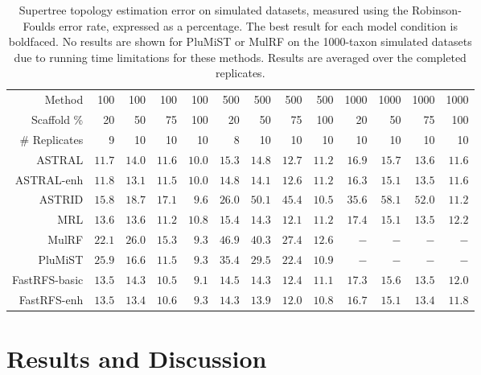 \begin{table}
\centering
\small
\begin{tabular}{|r|rrrrrrrrrrrr|}
\hline
Method&100 & 100 & 100 & 100 & 500 & 500 & 500 & 500 & 1000 & 1000 & 1000 &
1000\\
Scaffold \% &20 & 50 & 75 & 100 & 20 & 50 & 75 & 100 & 20 & 50 & 75 & 100\\
\# Replicates & 9 & 10 & 10 & 10 & 8 & 10 & 10 & 10 & 10 & 10 & 10 & 10 \\
\hline
\hline
ASTRAL& $\mathbf{11.7}$&$14.0$& $11.6$& $10.0$& $15.3$& $14.8$& $12.7$& $11.2$& $16.9$& $15.7$& $13.6$& $11.6$\\
ASTRAL-enh&$11.8$& $\mathbf{13.1}$&$11.5$& $10.0$& $14.8$&$14.1$& $12.6$& $11.2$& $\mathbf{16.3}$&$\mathbf{15.1}$&$13.5$&$11.6$\\
ASTRID& $15.8$& $18.7$& $17.1$&$9.6$&$26.0$& $50.1$& $45.4$&$\mathbf{10.5}$&$35.6$& $58.1$& $52.0$& $\mathbf{11.2}$\\
MRL&$13.6$& $13.6$& $11.2$& $10.8$& $15.4$& $14.3$& $12.1$& $11.2$& $17.4$&$\mathbf{15.1}$&$13.5$& $12.2$\\
MulRF&$22.1$& $26.0$& $15.3$& $9.3$&$46.9$& $40.3$& $27.4$& $12.6$& $-$&$-$&$-$&$-$\\
PluMiST&$25.9$& $16.6$& $11.5$& $9.3$&$35.4$& $29.5$& $22.4$& $10.9$&$-$&$-$&$-$&$-$\\
\hline
FastRFS-basic&$13.5$& $14.3$& $\mathbf{10.5}$&$\mathbf{9.1}$& $14.5$&$14.3$& $12.4$& $11.1$& $17.3$& $15.6$& $13.5$& $12.0$\\
FastRFS-enh&$13.5$& $13.4$& $10.6$& $9.3$&$\mathbf{14.3}$&$\mathbf{13.9}$&$\mathbf{12.0}$&$10.8$& $16.7$&$\mathbf{15.1}$&$\mathbf{13.4}$&$11.8$\\
\hline
\end{tabular}
  \caption[Supertree estimation error on simulated datasets for FastRFS and other methods]{Supertree topology estimation error on simulated datasets,
 measured using the Robinson-Foulds error rate, expressed
as a percentage.
The best result for each model condition is boldfaced. No results are shown
for PluMiST or MulRF on the 1000-taxon simulated datasets due to
running time limitations for these methods.
Results are averaged over the completed replicates. }
  \label{fastrfs::table:exp1-topo}
\end{table}




\section{Results and Discussion}
\label{fastrfs::sec:results}

